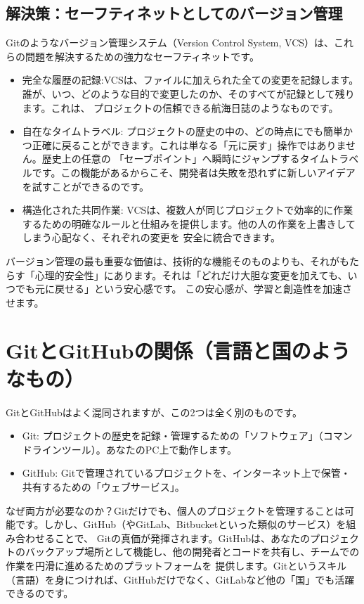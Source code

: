 \documentclass{ltjsarticle}
\begin{document}
\subsection{解決策：セーフティネットとしてのバージョン管理}
Gitのようなバージョン管理システム（Version Control System, VCS）は、これらの問題を解決するための強力なセーフティネットです。
\begin{itemize}
    \item 完全な履歴の記録:VCSは、ファイルに加えられた全ての変更を記録します。誰が、いつ、どのような目的で変更したのか、そのすべてが記録として残ります。これは、
    プロジェクトの信頼できる航海日誌のようなものです。
    \item 自在なタイムトラベル: プロジェクトの歴史の中の、どの時点にでも簡単かつ正確に戻ることができます。これは単なる「元に戻す」操作ではありません。歴史上の任意の
    「セーブポイント」へ瞬時にジャンプするタイムトラベルです。この機能があるからこそ、開発者は失敗を恐れずに新しいアイデアを試すことができるのです。
    \item 構造化された共同作業: VCSは、複数人が同じプロジェクトで効率的に作業するための明確なルールと仕組みを提供します。他の人の作業を上書きしてしまう心配なく、それぞれの変更を
    安全に統合できます。
\end{itemize}
バージョン管理の最も重要な価値は、技術的な機能そのものよりも、それがもたらす「心理的安全性」にあります。それは「どれだけ大胆な変更を加えても、いつでも元に戻せる」という安心感です。
この安心感が、学習と創造性を加速させます。

\section{GitとGitHubの関係（言語と国のようなもの）}
GitとGitHubはよく混同されますが、この2つは全く別のものです。
\begin{itemize}
    \item Git: プロジェクトの歴史を記録・管理するための「ソフトウェア」（コマンドラインツール）。あなたのPC上で動作します。
    \item GitHub: Gitで管理されているプロジェクトを、インターネット上で保管・共有するための「ウェブサービス」。
\end{itemize}
なぜ両方が必要なのか？Gitだけでも、個人のプロジェクトを管理することは可能です。しかし、GitHub（やGitLab、Bitbucketといった類似のサービス）を組み合わせることで、
Gitの真価が発揮されます。GitHubは、あなたのプロジェクトのバックアップ場所として機能し、他の開発者とコードを共有し、チームでの作業を円滑に進めるためのプラットフォームを
提供します。Gitというスキル（言語）を身につければ、GitHubだけでなく、GitLabなど他の「国」でも活躍できるのです。
\end{document}
